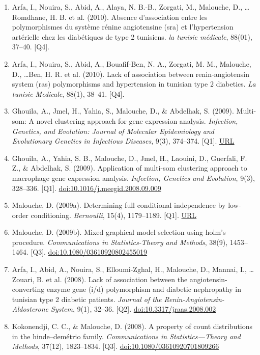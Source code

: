 \documentclass[11pt,a4paper,sans]{moderncv}
\begin{document}
\begin{enumerate}
\item Arfa, I., Nouira, S., Abid, A., Alaya, N. B.-B., Zorgati, M., Malouche, D., \ldots Romdhane, H. B. et al. (2010). Absence d'association entre les polymorphismes du système rénine angiotensine (sra) et l'hypertension artérielle chez les diabétiques de type 2 tunisiens. \textit{la tunisie médicale}, 88(01), 37–40. [Q4].
\item Arfa, I., Nouira, S., Abid, A., Bouafif-Ben, N. A., Zorgati, M. M., Malouche, D., \ldots Ben, H. R. et al. (2010). Lack of association between renin-angiotensin system (ras) polymorphisms and hypertension in tunisian type 2 diabetics. \textit{La tunisie Medicale}, 88(1), 38–41. [Q4].
\item Ghouila, A., Jmel, H., Yahia, S., Malouche, D., \& Abdelhak, S. (2009). Multi-som: A novel clustering approach for gene expression analysis. \textit{Infection, Genetics, and Evolution: Journal of Molecular Epidemiology and Evolutionary Genetics in Infectious Diseases}, 9(3), 374–374. [Q1]. \href{https://europepmc.org/article/med/18992849}{URL}
\item Ghouila, A., Yahia, S. B., Malouche, D., Jmel, H., Laouini, D., Guerfali, F. Z., \& Abdelhak, S. (2009). Application of multi-som clustering approach to macrophage gene expression analysis. \textit{Infection, Genetics and Evolution}, 9(3), 328–336. [Q1]. \href{https://doi.org/10.1016/j.meegid.2008.09.009}{doi:10.1016/j.meegid.2008.09.009}
\item Malouche, D. (2009a). Determining full conditional independence by low-order conditioning. \textit{Bernoulli}, 15(4), 1179–1189. [Q1]. \href{https://projecteuclid.org/journals/bernoulli/volume-15/issue-4/Determining-full-conditional-independence-by-low-order-conditioning/10.3150/09-BEJ193.full}{URL}
\item Malouche, D. (2009b). Mixed graphical model selection using holm's procedure. \textit{Communications in Statistics-Theory and Methods}, 38(9), 1453–1464. [Q3]. \href{https://doi.org/10.1080/03610920802455019}{doi:10.1080/03610920802455019}
\item Arfa, I., Abid, A., Nouira, S., Elloumi-Zghal, H., Malouche, D., Mannai, I., \ldots Zouari, B. et al. (2008). Lack of association between the angiotensin-converting enzyme gene (i/d) polymorphism and diabetic nephropathy in tunisian type 2 diabetic patients. \textit{Journal of the Renin-Angiotensin-Aldosterone System}, 9(1), 32–36. [Q2]. \href{https://doi.org/10.3317/jraas.2008.002}{doi:10.3317/jraas.2008.002}
\item Kokonendji, C. C., \& Malouche, D. (2008). A property of count distributions in the hinde–demétrio family. \textit{Communications in Statistics—Theory and Methods}, 37(12), 1823–1834. [Q3]. \href{https://doi.org/10.1080/03610920701809266}{doi:10.1080/03610920701809266}

\end{enumerate}
\end{document}
